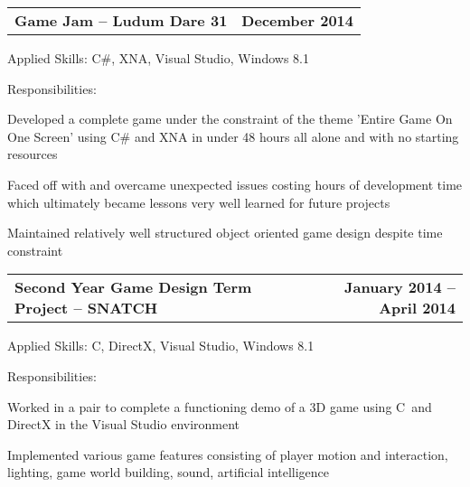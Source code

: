 \documentclass[10pt,letterpaper]{article}
\makeatletter
\newenvironment{indentsection}[1]%
{\begin{list}{}%
  {\setlength{\leftmargin}{#1}}%
  \item[]%
}
{\end{list}}
\newcommand{\headerrow}[2]
{\begin{tabular*}{\linewidth}{l@{\extracolsep{\fill}}r}
  #1 &
  #2 \\
\end{tabular*}}
\newcommand{\CPP}
{C\nolinebreak[4]\hspace{-.05em}\raisebox{.22ex}{\footnotesize\bf ++}}
\makeatother
\begin{document}
\begin{itemize}
  \item
  \headerrow
    {\textbf{Game Jam -- Ludum Dare 31}}
    {\textbf{December 2014}}
  \begin{indentsection}{1em}
    \begin{description*}
      \item[Applied Skills:]
      C\#, XNA, Visual Studio, Windows 8.1
      \item[Responsibilities:]
      \hfill
      \begin{itemize*}
        \item Developed a complete game under the constraint of the theme 'Entire
        Game On One Screen' using C\# and XNA in under 48 hours all alone and with
        no starting resources
        \item Faced off with and overcame unexpected issues costing hours of
        development time which ultimately became lessons very well learned for
        future projects
        \item Maintained relatively well structured object oriented game design
        despite time constraint
      \end{itemize*}
    \end{description*}
  \end{indentsection}

  \item
  \headerrow
    {\textbf{Second Year Game Design Term Project -- SNATCH}}
    {\textbf{January 2014 -- April 2014}}
  \begin{indentsection}{1em}
    \begin{description*}
      \item[Applied Skills:]
      \CPP, DirectX, Visual Studio, Windows 8.1
      \item[Responsibilities:]
      \hfill
      \begin{itemize*}
        \item Worked in a pair to complete a functioning demo of a 3D game using
        \CPP\ and DirectX in the Visual Studio environment
        \item Implemented various game features consisting of player motion and
        interaction, lighting, game world building, sound, artificial intelligence
      \end{itemize*}
    \end{description*}
  \end{indentsection}


\end{itemize}
\end{document}
